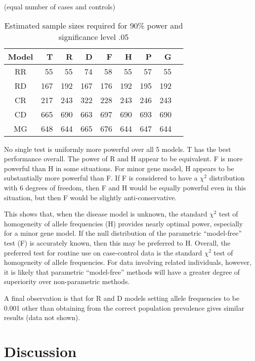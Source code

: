 \begin{table}[h]\centering
\caption{Estimated sample sizes required for 90\% power and significance level
.05\label{mfn}} (equal number of cases and controls)\\
\begin{tabular}{crrrrrrrr}
\\
\hline
    Model&     T&      R&      D&      F&     H &   P &   G\\
\hline
     RR  &    55&     55&     74&     58&    55 &  57 &  55\\
     RD  &   167&    192&    167&    176&   192 & 195 & 192\\
     CR  &   217&    243&    322&    228&   243 & 246 & 243\\
     CD  &   665&    690&    663&    697&   690 & 693 & 690\\
     MG  &   648&    644&    665&    676&   644 & 647 & 644\\
\hline
\end{tabular}
\end{table}

No single test is uniformly more powerful over all 5 models.  T has the best
performance overall.  The power of R and H appear to be equivalent.  F is more
powerful than H in some situations.  For minor gene model, H appears to be
substantially more powerful than F.  If F is considered to have a $\chi^2$
distribution with 6 degrees of freedom, then F and H would be equally powerful
even in this situation, but then F would be slightly anti-conservative.

This shows that, when the disease model is unknown, the standard $\chi^2$ test
of homogeneity of allele frequencies (H) provides nearly optimal power,
especially for a minor gene model.  If the null distribution of the parametric
``model-free'' test (F) is accurately known, then this may be preferred to H.
Overall, the preferred test for routine use on case-control data is the
standard $\chi^2$ test of homogeneity of allele frequencies.  For data
involving related individuals, however, it is likely that parametric
``model-free'' methods will have a greater degree of superiority over
non-parametric methods.

A final observation is that for R and D models setting allele frequencies to be
0.001 other than obtaining from the correct population prevalence gives similar
results (data not shown).


\section{Discussion}

